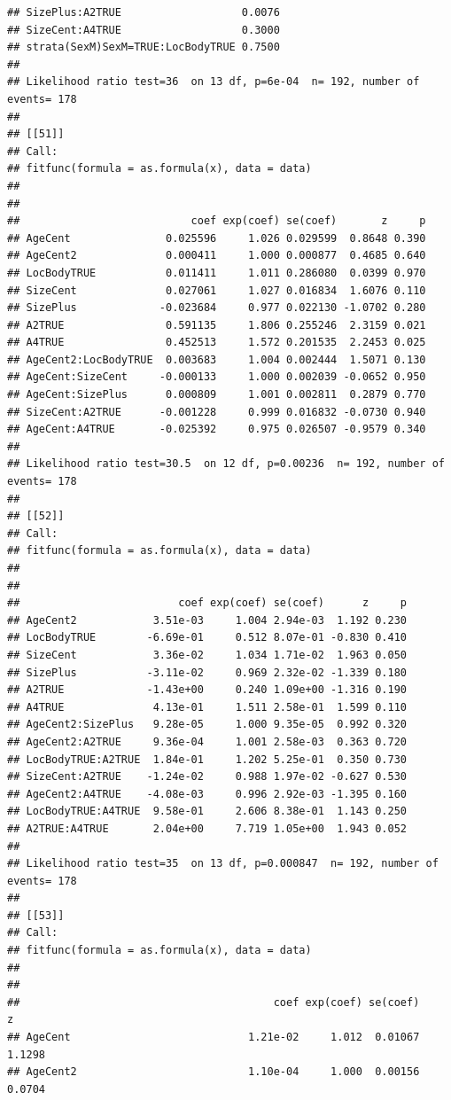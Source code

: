 \documentclass{article}\usepackage[]{graphicx}\usepackage[]{color}
\makeatletter
\newenvironment{kframe}{%
 \def\at@end@of@kframe{}%
 \ifinner\ifhmode%
  \def\at@end@of@kframe{\end{minipage}}%
  \begin{minipage}{\columnwidth}%
 \fi\fi%
 \def\FrameCommand##1{\hskip\@totalleftmargin \hskip-\fboxsep
 \colorbox{shadecolor}{##1}\hskip-\fboxsep
     \hskip-\linewidth \hskip-\@totalleftmargin \hskip\columnwidth}%
 \MakeFramed {\advance\hsize-\width
   \@totalleftmargin\z@ \linewidth\hsize
   \@setminipage}}%
 {\par\unskip\endMakeFramed%
 \at@end@of@kframe}
\newenvironment{knitrout}{}{} %
\makeatother
\begin{document}
\begin{knitrout}
\begin{kframe}
\begin{verbatim}
## SizePlus:A2TRUE                   0.0076
## SizeCent:A4TRUE                   0.3000
## strata(SexM)SexM=TRUE:LocBodyTRUE 0.7500
## 
## Likelihood ratio test=36  on 13 df, p=6e-04  n= 192, number of events= 178 
## 
## [[51]]
## Call:
## fitfunc(formula = as.formula(x), data = data)
## 
## 
##                           coef exp(coef) se(coef)       z     p
## AgeCent               0.025596     1.026 0.029599  0.8648 0.390
## AgeCent2              0.000411     1.000 0.000877  0.4685 0.640
## LocBodyTRUE           0.011411     1.011 0.286080  0.0399 0.970
## SizeCent              0.027061     1.027 0.016834  1.6076 0.110
## SizePlus             -0.023684     0.977 0.022130 -1.0702 0.280
## A2TRUE                0.591135     1.806 0.255246  2.3159 0.021
## A4TRUE                0.452513     1.572 0.201535  2.2453 0.025
## AgeCent2:LocBodyTRUE  0.003683     1.004 0.002444  1.5071 0.130
## AgeCent:SizeCent     -0.000133     1.000 0.002039 -0.0652 0.950
## AgeCent:SizePlus      0.000809     1.001 0.002811  0.2879 0.770
## SizeCent:A2TRUE      -0.001228     0.999 0.016832 -0.0730 0.940
## AgeCent:A4TRUE       -0.025392     0.975 0.026507 -0.9579 0.340
## 
## Likelihood ratio test=30.5  on 12 df, p=0.00236  n= 192, number of events= 178 
## 
## [[52]]
## Call:
## fitfunc(formula = as.formula(x), data = data)
## 
## 
##                         coef exp(coef) se(coef)      z     p
## AgeCent2            3.51e-03     1.004 2.94e-03  1.192 0.230
## LocBodyTRUE        -6.69e-01     0.512 8.07e-01 -0.830 0.410
## SizeCent            3.36e-02     1.034 1.71e-02  1.963 0.050
## SizePlus           -3.11e-02     0.969 2.32e-02 -1.339 0.180
## A2TRUE             -1.43e+00     0.240 1.09e+00 -1.316 0.190
## A4TRUE              4.13e-01     1.511 2.58e-01  1.599 0.110
## AgeCent2:SizePlus   9.28e-05     1.000 9.35e-05  0.992 0.320
## AgeCent2:A2TRUE     9.36e-04     1.001 2.58e-03  0.363 0.720
## LocBodyTRUE:A2TRUE  1.84e-01     1.202 5.25e-01  0.350 0.730
## SizeCent:A2TRUE    -1.24e-02     0.988 1.97e-02 -0.627 0.530
## AgeCent2:A4TRUE    -4.08e-03     0.996 2.92e-03 -1.395 0.160
## LocBodyTRUE:A4TRUE  9.58e-01     2.606 8.38e-01  1.143 0.250
## A2TRUE:A4TRUE       2.04e+00     7.719 1.05e+00  1.943 0.052
## 
## Likelihood ratio test=35  on 13 df, p=0.000847  n= 192, number of events= 178 
## 
## [[53]]
## Call:
## fitfunc(formula = as.formula(x), data = data)
## 
## 
##                                        coef exp(coef) se(coef)       z
## AgeCent                            1.21e-02     1.012  0.01067  1.1298
## AgeCent2                           1.10e-04     1.000  0.00156  0.0704

\end{verbatim}
\end{kframe}
\end{knitrout}
\end{document}
